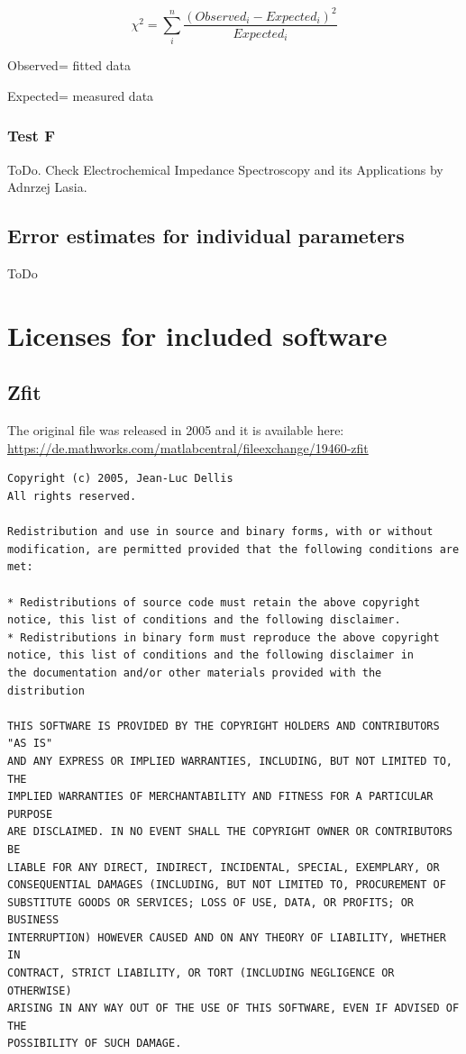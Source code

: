 \documentclass[10pt,a4paper,oneside]{book}
\begin{document}
\[ \chi^2 = \sum_i^n{\dfrac{(Observed_i-Expected_i)^2}{Expected_i}} \]

Observed= fitted data

Expected= measured data

\subsection{Test F}

ToDo. Check Electrochemical Impedance Spectroscopy and its Applications by Adnrzej Lasia.

\section{Error estimates for individual parameters}

ToDo


\newpage{}
\chapter{Licenses for included software}

\section{Zfit}

The original file was released in 2005 and it is available here:\\

\url{https://de.mathworks.com/matlabcentral/fileexchange/19460-zfit}

\begin{small}
\begin{verbatim}
Copyright (c) 2005, Jean-Luc Dellis
All rights reserved.

Redistribution and use in source and binary forms, with or without
modification, are permitted provided that the following conditions are
met:

* Redistributions of source code must retain the above copyright
notice, this list of conditions and the following disclaimer.
* Redistributions in binary form must reproduce the above copyright
notice, this list of conditions and the following disclaimer in
the documentation and/or other materials provided with the distribution

THIS SOFTWARE IS PROVIDED BY THE COPYRIGHT HOLDERS AND CONTRIBUTORS "AS IS"
AND ANY EXPRESS OR IMPLIED WARRANTIES, INCLUDING, BUT NOT LIMITED TO, THE
IMPLIED WARRANTIES OF MERCHANTABILITY AND FITNESS FOR A PARTICULAR PURPOSE
ARE DISCLAIMED. IN NO EVENT SHALL THE COPYRIGHT OWNER OR CONTRIBUTORS BE
LIABLE FOR ANY DIRECT, INDIRECT, INCIDENTAL, SPECIAL, EXEMPLARY, OR
CONSEQUENTIAL DAMAGES (INCLUDING, BUT NOT LIMITED TO, PROCUREMENT OF
SUBSTITUTE GOODS OR SERVICES; LOSS OF USE, DATA, OR PROFITS; OR BUSINESS
INTERRUPTION) HOWEVER CAUSED AND ON ANY THEORY OF LIABILITY, WHETHER IN
CONTRACT, STRICT LIABILITY, OR TORT (INCLUDING NEGLIGENCE OR OTHERWISE)
ARISING IN ANY WAY OUT OF THE USE OF THIS SOFTWARE, EVEN IF ADVISED OF THE
POSSIBILITY OF SUCH DAMAGE.
\end{verbatim}
\end{small}
\end{document}
